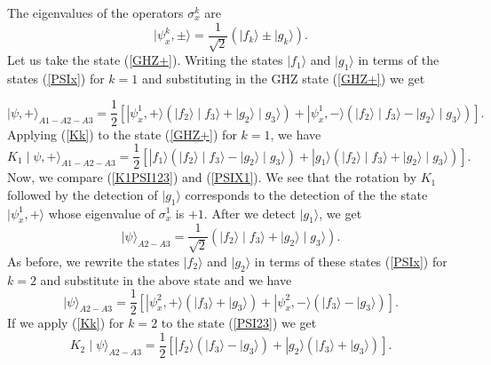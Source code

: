 \documentclass[12pt,thmsa]{article}
\begin{document}
The eigenvalues of the operators $\sigma _{x}^{k}$ are%
\begin{equation}
|\psi _{x}^{k},\pm \rangle =\frac{1}{\sqrt{2}}(\mid f_{k}\rangle \pm \mid
g_{k}\rangle ).  \label{PSIx}
\end{equation}%
Let us take the state (\ref{GHZ+}). Writing the states $\mid f_{1}\rangle $
and $\mid g_{1}\rangle $ in terms of the states (\ref{PSIx}) for $k=1$ and
substituting in the GHZ state (\ref{GHZ+}) we get

\begin{equation}
\mid \psi ,+\rangle _{A1-A2-A3}=\frac{1}{2}[|\psi _{x}^{1},+\rangle (\mid
f_{2}\rangle \mid f_{3}\rangle +\mid g_{2}\rangle \mid g_{3}\rangle )+|\psi
_{x}^{1},-\rangle (\mid f_{2}\rangle \mid f_{3}\rangle -\mid g_{2}\rangle
\mid g_{3}\rangle )].  \label{PSIX1}
\end{equation}%
Applying (\ref{Kk}) to the state (\ref{GHZ+}) for $k=1$, we have%
\begin{equation}
K_{1}\mid \psi ,+\rangle _{A1-A2-A3}=\frac{1}{2}[|f_{1}\rangle (\mid
f_{2}\rangle \mid f_{3}\rangle -\mid g_{2}\rangle \mid g_{3}\rangle
)+|g_{1}\rangle (\mid f_{2}\rangle \mid f_{3}\rangle +\mid g_{2}\rangle \mid
g_{3}\rangle )].  \label{K1PSI123}
\end{equation}%
Now, we compare (\ref{K1PSI123}) and (\ref{PSIX1}). We see that the rotation
by $K_{1}$ followed by the detection of $|g_{1}\rangle $ corresponds to the
detection of the the state $|\psi _{x}^{1},+\rangle $ whose eigenvalue of $%
\sigma _{x}^{1}$ is $+1$. After we detect $|g_{1}\rangle $, we get%
\begin{equation}
\mid \psi \rangle _{A2-A3}=\frac{1}{\sqrt{2}}(\mid f_{2}\rangle \mid
f_{3}\rangle +\mid g_{2}\rangle \mid g_{3}\rangle ).  \label{PSI23}
\end{equation}%
As before, we rewrite the states $\mid f_{2}\rangle $ and $\mid g_{2}\rangle 
$ in terms of these states (\ref{PSIx}) for $k=2$ and substitute in the
above state and we have 
\begin{equation}
\mid \psi \rangle _{A2-A3}=\frac{1}{2}[|\psi _{x}^{2},+\rangle (\mid
f_{3}\rangle +\mid g_{3}\rangle )+|\psi _{x}^{2},-\rangle (\mid f_{3}\rangle
-\mid g_{3}\rangle )].  \label{PSIX2}
\end{equation}%
If we apply (\ref{Kk}) for $k=2$ to the state (\ref{PSI23}) we get%
\begin{equation}
K_{2}\mid \psi \rangle _{A2-A3}=\frac{1}{2}[|f_{2}\rangle (\mid f_{3}\rangle
-\mid g_{3}\rangle )+|g_{2}\rangle (\mid f_{3}\rangle +\mid g_{3}\rangle )].
\label{K2PSI23}
\end{equation}%
\end{document}
